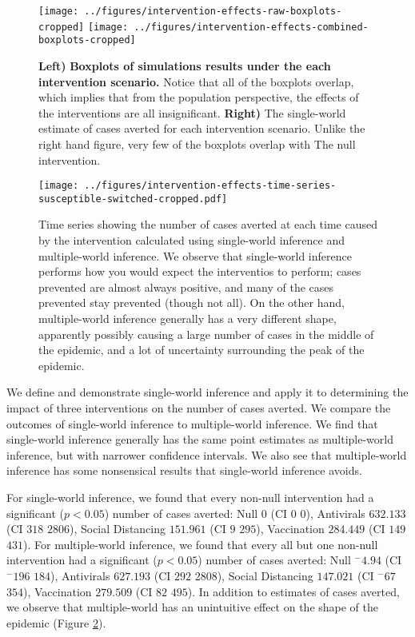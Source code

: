 \documentclass[PTRSB]{rsos}
\makeatletter
\renewcommand{\neg}{{}^-}
\def\checkGraphicsWidth{\ifdim\Gin@nat@width>\linewidth
	\tsGraphicsScaleX\linewidth\else\Gin@nat@width\fi}
\let\ts@includegraphics\includegraphics
\renewcommand{\includegraphics}[1]{\ts@includegraphics[width=\checkGraphicsWidth]{#1}}
\makeatother
\begin{document}
\begin{multicols}{2}
\begin{figure}
\centering
\texttt{[image: ../figures/intervention-effects-raw-boxplots-cropped]}
\texttt{[image: ../figures/intervention-effects-combined-boxplots-cropped]}
\caption{\textbf{Left)} \textbf{Boxplots of simulations results under the each intervention scenario.}  Notice that all of the boxplots overlap, which implies that from the population perspective, the effects of the interventions are all insignificant.  \textbf{Right)} The single-world estimate of cases averted for each intervention scenario.  Unlike the right hand figure, very few of the boxplots overlap with The null intervention.}
\label{fig:boxplots}
\end{figure}

\begin{figure}
\centering
\texttt{[image: ../figures/intervention-effects-time-series-susceptible-switched-cropped.pdf]}
\caption{Time series showing the number of cases averted at each time caused by the intervention calculated using single-world inference and multiple-world inference.  We observe that single-world inference performs how you would expect the interventios to perform; cases prevented are almost always positive, and many of the cases prevented stay prevented (though not all). On the other hand, multiple-world inference generally has a very different shape, apparently possibly causing a large number of cases in the middle of the epidemic, and a lot of uncertainty surrounding the peak of the epidemic.}
\label{fig:epicurve}
\end{figure}

We define and demonstrate single-world inference and apply it to determining the impact of three interventions on the number of cases averted.
We compare the outcomes of single-world inference to multiple-world inference.
We find that single-world inference generally has the same point estimates as multiple-world inference, but with narrower confidence intervals.
We also see that multiple-world inference has some nonsensical results that single-world inference avoids.

For single-world inference, we found that every non-null intervention had a significant ($p<0.05$) number of cases averted: Null $ 0 $ (CI $ 0 $ \textemdash $ 0 $), Antivirals $ 632.133 $ (CI $ 318 $ \textemdash $ 2806 $), Social Distancing $ 151.961 $ (CI $ 9 $ \textemdash $ 295 $), Vaccination $ 284.449 $ (CI $ 149 $ \textemdash $ 431 $).
For multiple-world inference, we found that every all but one non-null intervention had a significant ($p<0.05$) number of cases averted: Null $ \neg4.94 $ (CI $ \neg196 $ \textemdash $ 184 $), Antivirals $ 627.193 $ (CI $ 292 $ \textemdash $ 2808 $), Social Distancing $ 147.021 $ (CI $ \neg67 $ \textemdash $ 354 $), Vaccination $ 279.509 $ (CI $ 82 $ \textemdash $ 495 $).
In addition to estimates of cases averted, we observe that multiple-world has an unintuitive effect on the shape of the epidemic (Figure \ref{fig:epicurve}).


\end{multicols}
\end{document}
